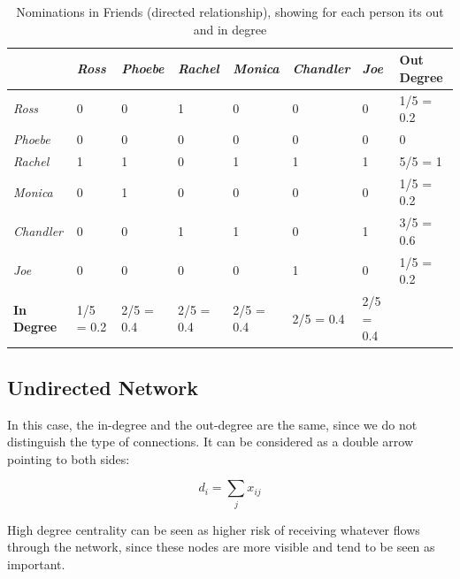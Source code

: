 \documentclass[
  notitlepage,
  onecolumn,
  openany]{book}
\begin{document}
\begin{table}[h!]
\centering
\begin{tabular}{@{}llllllll@{}}
\toprule
                   & \textit{Ross} & \textit{Phoebe} & \textit{Rachel} & \textit{Monica} & \textit{Chandler} & \textit{Joe} & \textbf{Out Degree} \\ \midrule
\textit{Ross}      & 0             & 0               & 1               & 0               & 0                 & 0            & 1/5 = 0.2           \\
\textit{Phoebe}    & 0             & 0               & 0               & 0               & 0                 & 0            & 0                   \\
\textit{Rachel}    & 1             & 1               & 0               & 1               & 1                 & 1            & 5/5 = 1             \\
\textit{Monica}    & 0             & 1               & 0               & 0               & 0                 & 0            & 1/5 = 0.2           \\
\textit{Chandler}  & 0             & 0               & 1               & 1               & 0                 & 1            & 3/5 = 0.6           \\
\textit{Joe}       & 0             & 0               & 0               & 0               & 1                 & 0            & 1/5 = 0.2           \\
\textbf{In Degree} & 1/5 = 0.2     & 2/5 = 0.4       & 2/5 = 0.4       & 2/5 = 0.4       & 2/5 = 0.4         & 2/5 = 0.4    &                     \\ \bottomrule
\end{tabular}
\caption{Nominations in Friends (directed relationship), showing for each person its out and in degree}
\label{tab:norm_dir_degree}
\end{table}

\hypertarget{undirected-network}{%
\subsection{Undirected Network}\label{undirected-network}}

In this case, the in-degree and the out-degree are the same, since we do not distinguish the type of connections. It can be considered as a double arrow pointing to both sides:

\[
d_i = \sum_j x_{ij}
\]

High degree centrality can be seen as higher risk of receiving whatever flows through the network, since these nodes are more visible and tend to be seen as important.
\end{document}
